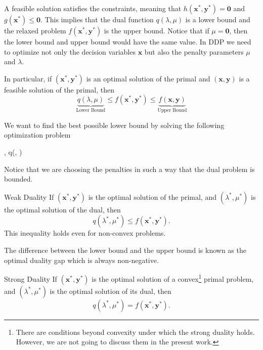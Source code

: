 A feasible solution satisfies the constraints, meaning that $h(\mathbf{x}^{*}, \mathbf{y}^{*})=\mathbf{0}$ and $g(\mathbf{x}^{*}) \leq \mathbf{0}$. This implies that the dual function $q(\lambda,\mu)$ is a lower bound and the relaxed problem $f(\mathbf{x}^{*}, \mathbf{y}^{*})$ is the upper bound. Notice that if $\mu = \mathbf{0}$, then the lower bound and upper bound would have the same value. In DDP we need to optimize not only the decision variables $\mathbf{x}$ but also the penalty parameters $\mu$ and $\lambda$.
\begin{corollary}{}{}
  In particular, if $(\mathbf{x}^{*}, \mathbf{y}^{*})$ is an optimal solution of the primal and $(\mathbf{x}, \mathbf{y})$ is a feasible solution of the primal, then
  \begin{equation}
      \underbrace{q({\lambda,\mu})}_{\textrm{Lower Bound}} \leq f(\mathbf{x}^{*}, \mathbf{y}^{*}) \leq \underbrace{f(\mathbf{x}, \mathbf{y})}_{\textrm{Upper Bound}}
  \end{equation}
\end{corollary}
We want to find the best possible lower bound by solving the following optimization problem
\begin{maxi!}[2]
	{\lambda, \mu}{q(\lambda, \mu)}{\label{eq: Abstract_Dual}}{}{}
\end{maxi!}
Notice that we are choosing the penalties in such a way that the dual problem is bounded.
\begin{theorem}{Weak Duality}{}
If $(\mathbf{x}^{*}, \mathbf{y}^{*})$ is the optimal solution of the primal, and $(\lambda^{*}, \mu^{*})$ is the optimal solution of the dual, then
\begin{equation}
    q(\lambda^{*}, \mu^{*}) \leq f(\mathbf{x}^{*}, \mathbf{y}^{*}).
\end{equation}
This inequality holds even for non-convex problems.
\end{theorem}
The difference between the lower bound and the upper bound is known as the optimal duality gap which is always non-negative.
\begin{theorem}{Strong Duality}{}
If $(\mathbf{x}^{*}, \mathbf{y}^{*})$ is the optimal solution of a convex\footnote{There are conditions beyond convexity under which the strong duality holds. However, we are not going to discuss them in the present work.} primal problem, and $(\lambda^{*}, \mu^{*})$ is the optimal solution of its dual, then
\begin{equation}
    q(\lambda^{*}, \mu^{*}) = f(\mathbf{x}^{*}, \mathbf{y}^{*}).
\end{equation}
\end{theorem}
